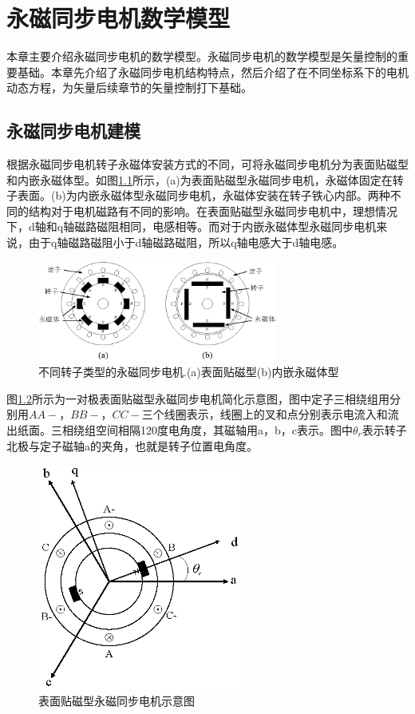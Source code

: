 
\chapter{永磁同步电机数学模型}\label{ch:model}
本章主要介绍永磁同步电机的数学模型。永磁同步电机的数学模型是矢量控制的重要基础。本章先介绍了永磁同步电机结构特点，然后介绍了在不同坐标系下的电机动态方程，为矢量后续章节的矢量控制打下基础。

\section{永磁同步电机建模}
根据永磁同步电机转子永磁体安装方式的不同，可将永磁同步电机分为表面贴磁型和内嵌永磁体型。如图\ref{fig:motorType}所示，(a)为表面贴磁型永磁同步电机，永磁体固定在转子表面。(b)为内嵌永磁体型永磁同步电机，永磁体安装在转子铁心内部。两种不同的结构对于电机磁路有不同的影响。在表面贴磁型永磁同步电机中，理想情况下，d轴和q轴磁路磁阻相同，电感相等。而对于内嵌永磁体型永磁同步电机来说，由于q轴磁路磁阻小于d轴磁路磁阻，所以q轴电感大于d轴电感。
\begin{figure}[H]
	\centering
	\includegraphics[width=0.7\textwidth]{figs/motor-types.eps}
	\caption{不同转子类型的永磁同步电机.(a)表面贴磁型(b)内嵌永磁体型}
	\label{fig:motorType}
\end{figure}
图\ref{fig:PMSM}所示为一对极表面贴磁型永磁同步电机简化示意图，图中定子三相绕组用分别用$AA-$，$BB-$，$CC-$三个线圈表示，线圈上的叉和点分别表示电流入和流出纸面。三相绕组空间相隔120度电角度，其磁轴用a，b，c表示。图中$\theta_{r}$表示转子北极与定子磁轴a的夹角，也就是转子位置电角度。
\begin{figure}[H]
	\centering
	\includegraphics[width=0.6\textwidth]{figs/PMSM.eps}
	\caption{表面贴磁型永磁同步电机示意图}
	\label{fig:PMSM}
\end{figure}
